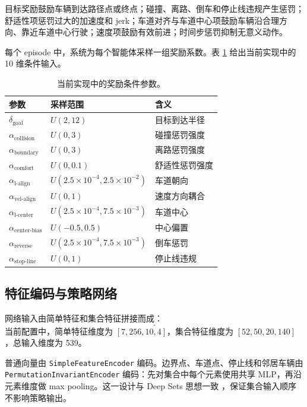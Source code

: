 \documentclass[preprint,12pt]{elsarticle}
\begin{document}
目标奖励鼓励车辆到达路径点或终点；碰撞、离路、倒车和停止线违规产生惩罚；舒适性项惩罚过大的加速度和 jerk；车道对齐与车道中心项鼓励车辆沿合理方向、靠近车道中心行驶；速度项鼓励有效前进；时间步惩罚抑制无意义动作。

每个 episode 中，系统为每个智能体采样一组奖励系数。表 \ref{tab:reward_params} 给出当前实现中的 10 维条件输入。

\begin{table}[t]
\centering
\caption{当前实现中的奖励条件参数。}
\label{tab:reward_params}
\begin{tabular}{lll}
\toprule
参数 & 采样范围 & 含义 \\
\midrule
$\delta_{\text{goal}}$ & $U(2,12)$ & 目标到达半径 \\
$\alpha_{\text{collision}}$ & $U(0,3)$ & 碰撞惩罚强度 \\
$\alpha_{\text{boundary}}$ & $U(0,3)$ & 离路惩罚强度 \\
$\alpha_{\text{comfort}}$ & $U(0,0.1)$ & 舒适性惩罚强度 \\
$\alpha_{\text{l-align}}$ & $U(2.5{\times}10^{-4},2.5{\times}10^{-2})$ & 车道朝向 \\
$\alpha_{\text{vel-align}}$ & $U(0,1)$ & 速度方向耦合 \\
$\alpha_{\text{l-center}}$ & $U(2.5{\times}10^{-4},7.5{\times}10^{-3})$ & 车道中心 \\
$\alpha_{\text{center-bias}}$ & $U(-0.5,0.5)$ & 中心偏置 \\
$\alpha_{\text{reverse}}$ & $U(2.5{\times}10^{-4},7.5{\times}10^{-3})$ & 倒车惩罚 \\
$\alpha_{\text{stop-line}}$ & $U(0,1)$ & 停止线违规 \\
\bottomrule
\end{tabular}
\end{table}

\subsection{特征编码与策略网络}

网络输入由简单特征和集合特征拼接而成：
\begin{equation}
  [S(t),G(t),C_{\text{reward}},C_{\text{style}},
  W_{\text{boundary}},W_{\text{lane}},W_{\text{stop}},A(t)].
\end{equation}
当前配置中，简单特征维度为 $[7,256,10,4]$，集合特征维度为 $[52,50,20,140]$，总输入维度为 539。

普通向量由 \texttt{SimpleFeatureEncoder} 编码。边界点、车道点、停止线和邻居车辆由 \texttt{PermutationInvariantEncoder} 编码：先对集合中每个元素使用共享 MLP，再沿元素维度做 max pooling。这一设计与 Deep Sets 思想一致 \citep{zaheer2017deepsets}，保证集合输入顺序不影响策略输出。
\end{document}
